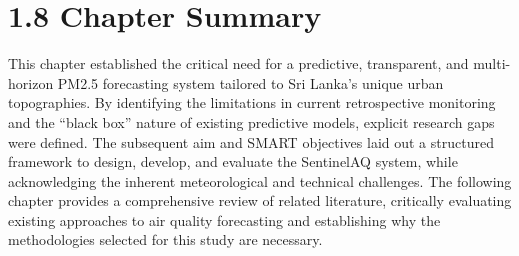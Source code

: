 \section{1.8 Chapter Summary}\label{chapter-summary}

This chapter established the critical need for a predictive,
transparent, and multi-horizon PM2.5 forecasting system tailored to Sri
Lanka's unique urban topographies. By identifying the limitations in
current retrospective monitoring and the ``black box'' nature of
existing predictive models, explicit research gaps were defined. The
subsequent aim and SMART objectives laid out a structured framework to
design, develop, and evaluate the SentinelAQ system, while acknowledging
the inherent meteorological and technical challenges. The following
chapter provides a comprehensive review of related literature,
critically evaluating existing approaches to air quality forecasting and
establishing why the methodologies selected for this study are
necessary.

